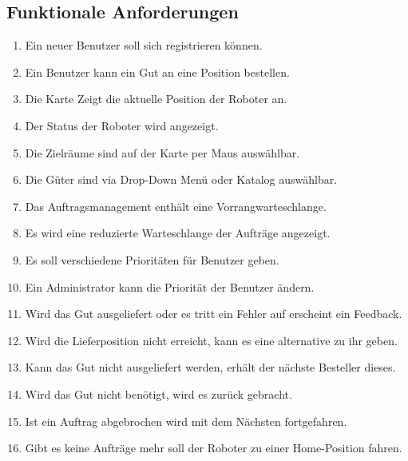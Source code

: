 \subsection{Funktionale Anforderungen}
\begin{enumerate}[nosep,style=sameline]
\renewcommand{\labelenumi}{LFA \textbf{\theenumi.}}
\item Ein neuer Benutzer soll sich registrieren können.
\item Ein Benutzer kann ein Gut an eine Position bestellen.
\item Die Karte Zeigt die aktuelle Position der Roboter an.
\item Der Status der Roboter wird angezeigt.
\item Die Zielräume sind auf der Karte per Maus auswählbar.
\item Die Güter sind via Drop-Down Menü oder  Katalog auswählbar.
\item Das Auftragsmanagement enthält eine Vorrangwarteschlange. 
\item Es wird eine reduzierte Warteschlange der Aufträge angezeigt.
\item Es soll verschiedene Prioritäten für Benutzer geben.
\item Ein Administrator kann die Priorität der Benutzer ändern.
\item Wird das Gut ausgeliefert oder es tritt ein Fehler auf erscheint ein Feedback.
\item Wird die Lieferposition nicht erreicht, kann es eine alternative zu ihr geben.
\item Kann das Gut nicht ausgeliefert werden, erhält der nächste Besteller dieses.
\item Wird das Gut nicht benötigt, wird es zurück gebracht.
\item Ist ein Auftrag abgebrochen wird mit dem Nächsten fortgefahren.
\item Gibt es keine Aufträge mehr soll der Roboter zu einer Home-Position fahren.
\end{enumerate}
